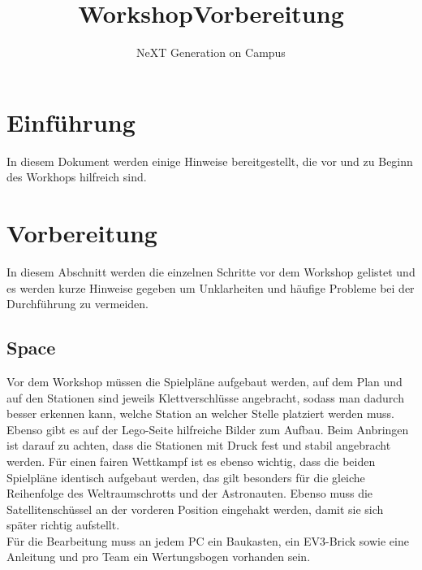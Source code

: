 \documentclass[
	ngerman,
	IMRAD=false,
	DIV=calc,
	paper=a4,
	marginpar=false,
	accentcolor=1c,%
	]{tudapub}
\begin{document}




\title{Workshop\newline Vorbereitung}
\subtitle{NeXT Generation on Campus}
\date{}





\maketitle


\newpage


\tableofcontents
\section{Einf\"uhrung}
In diesem Dokument werden einige Hinweise bereitgestellt, die vor und zu Beginn des Workhops hilfreich sind.

\section{Vorbereitung}
In diesem Abschnitt werden die einzelnen Schritte vor dem Workshop gelistet und es werden kurze Hinweise gegeben um Unklarheiten und h\"aufige Probleme bei der Durchf\"uhrung zu vermeiden.

\subsection{Space}
Vor dem Workshop m\"ussen die Spielpl\"ane aufgebaut werden, auf dem Plan und auf den Stationen sind jeweils Klettverschl\"usse angebracht, sodass man dadurch besser erkennen kann, welche Station an welcher Stelle platziert werden muss. Ebenso gibt es auf der Lego-Seite hilfreiche Bilder zum Aufbau. Beim Anbringen ist darauf zu achten, dass die Stationen mit Druck fest und stabil angebracht werden. \newline
F\"ur einen fairen Wettkampf ist es ebenso wichtig, dass die beiden Spielpl\"ane identisch aufgebaut werden, das gilt besonders f\"ur die gleiche Reihenfolge des Weltraumschrotts und der Astronauten. Ebenso muss die Satellitensch\"ussel an der vorderen Position eingehakt werden, damit sie sich sp\"ater richtig aufstellt.\\
F\"ur die Bearbeitung muss an jedem PC ein Baukasten, ein EV3-Brick sowie eine Anleitung und pro Team ein Wertungsbogen vorhanden sein.
\end{document}

